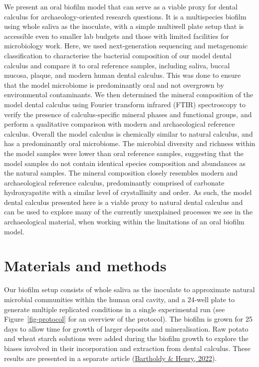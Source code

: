 \documentclass[
  letterpaper,
]{book}
\begin{document}
We present an oral biofilm model that can serve as a viable proxy for
dental calculus for archaeology-oriented research questions. It is a
multispecies biofilm using whole saliva as the inoculate, with a simple
multiwell plate setup that is accessible even to smaller lab budgets and
those with limited facilities for microbiology work. Here, we used
next-generation sequencing and metagenomic classification to
characterise the bacterial composition of our model dental calculus and
compare it to oral reference samples, including saliva, buccal mucosa,
plaque, and modern human dental calculus. This was done to ensure that
the model microbiome is predominantly oral and not overgrown by
environmental contaminants. We then determined the mineral composition
of the model dental calculus using Fourier transform infrared (FTIR)
spectroscopy to verify the presence of calculus-specific mineral phases
and functional groups, and perform a qualitative comparison with modern
and archaeological reference calculus. Overall the model calculus is
chemically similar to natural calculus, and has a predominantly oral
microbiome. The microbial diversity and richness within the model
samples were lower than oral reference samples, suggesting that the
model samples do not contain identical species composition and
abundances as the natural samples. The mineral composition closely
resembles modern and archaeological reference calculus, predominantly
comprised of carbonate hydroxyapatite with a similar level of
crystallinity and order. As such, the model dental calculus presented
here is a viable proxy to natural dental calculus and can be used to
explore many of the currently unexplained processes we see in the
archaeological material, when working within the limitations of an oral
biofilm model.

\hypertarget{materials-and-methods}{%
\section{Materials and methods}\label{materials-and-methods}}

Our biofilm setup consists of whole saliva as the inoculate to
approximate natural microbial communities within the human oral cavity,
and a 24-well plate to generate multiple replicated conditions in a
single experimental run (see Figure~\ref{fig-protocol} for an overview
of the protocol). The biofilm is grown for 25 days to allow time for
growth of larger deposits and mineralisation. Raw potato and wheat
starch solutions were added during the biofilm growth to explore the
biases involved in their incorporation and extraction from dental
calculus. These results are presented in a separate article
(\protect\hyperlink{ref-bartholdyInvestigatingBiases2022}{Bartholdy \&
Henry, 2022}).
\end{document}
